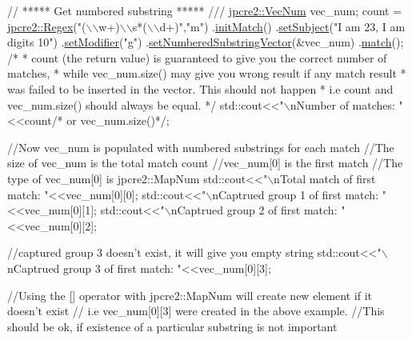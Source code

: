 \begin{DoxyCode}
\textcolor{comment}{// ***** Get numbered substring ***** ///}
\hyperlink{namespacejpcre2_ac1cf752c8fbb0be78020be3b80e77ce3}{jpcre2::VecNum} vec\_num;
count = 
\hyperlink{classjpcre2_1_1Regex}{jpcre2::Regex}(\textcolor{stringliteral}{"(\(\backslash\)\(\backslash\)w+)\(\backslash\)\(\backslash\)s*(\(\backslash\)\(\backslash\)d+)"},\textcolor{stringliteral}{"m"})
        .\hyperlink{classjpcre2_1_1Regex_a519b0915bf1163c6ce6a4d674b30cfcd_a519b0915bf1163c6ce6a4d674b30cfcd}{initMatch}()
        .\hyperlink{classjpcre2_1_1RegexMatch_a635c652195deaa8ebb9e107c4f972aab_a635c652195deaa8ebb9e107c4f972aab}{setSubject}(\textcolor{stringliteral}{"I am 23, I am digits 10"})
        .\hyperlink{classjpcre2_1_1RegexMatch_a9df7e92f96b61553f62720cb8f5f23e5_a9df7e92f96b61553f62720cb8f5f23e5}{setModifier}(\textcolor{stringliteral}{"g"})
        .\hyperlink{classjpcre2_1_1RegexMatch_a2c7efe1ec2e13827f670db4ecedcd0a0_a2c7efe1ec2e13827f670db4ecedcd0a0}{setNumberedSubstringVector}(&vec\_num)
        .\hyperlink{classjpcre2_1_1RegexMatch_a5868aef3a146594ea1ebef34d122bb33_a5868aef3a146594ea1ebef34d122bb33}{match}();
\textcolor{comment}{/*}
\textcolor{comment}{* count (the return value) is guaranteed to give you the correct number of matches,}
\textcolor{comment}{* while vec\_num.size() may give you wrong result if any match result}
\textcolor{comment}{* was failed to be inserted in the vector. This should not happen}
\textcolor{comment}{* i.e count and vec\_num.size() should always be equal.}
\textcolor{comment}{*/}
std::cout<<\textcolor{stringliteral}{"\(\backslash\)nNumber of matches: "}<<count\textcolor{comment}{/* or vec\_num.size()*/};

\textcolor{comment}{//Now vec\_num is populated with numbered substrings for each match}
\textcolor{comment}{//The size of vec\_num is the total match count}
\textcolor{comment}{//vec\_num[0] is the first match}
\textcolor{comment}{//The type of vec\_num[0] is jpcre2::MapNum}
std::cout<<\textcolor{stringliteral}{"\(\backslash\)nTotal match of first match: "}<<vec\_num[0][0];      
std::cout<<\textcolor{stringliteral}{"\(\backslash\)nCaptrued group 1 of first match: "}<<vec\_num[0][1]; 
std::cout<<\textcolor{stringliteral}{"\(\backslash\)nCaptrued group 2 of first match: "}<<vec\_num[0][2]; 

 \textcolor{comment}{//captured group 3 doesn't exist, it will give you empty string}
std::cout<<\textcolor{stringliteral}{"\(\backslash\)nCaptrued group 3 of first match: "}<<vec\_num[0][3];

\textcolor{comment}{//Using the [] operator with jpcre2::MapNum will create new element if it doesn't exist}
\textcolor{comment}{// i.e vec\_num[0][3] were created in the above example.}
\textcolor{comment}{//This should be ok, if existence of a particular substring is not important}


\end{DoxyCode}
